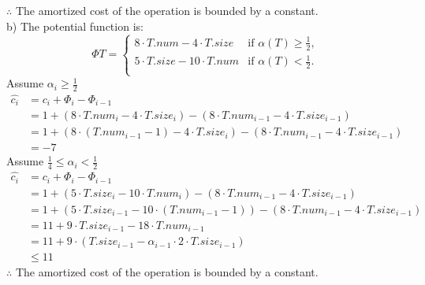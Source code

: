 \documentclass[12pt,letterpaper]{article}
\begin{document}
$\therefore$ The amortized cost of the operation is bounded by a constant. \\
b) The potential function is:
\begin{equation}
    \Phi{T}=
   \begin{cases}
   8 \cdot T.num - 4 \cdot T.size &\mbox{if $\alpha(T) \ge \frac{1}{2}$,}\\
   5 \cdot T.size - 10 \cdot T.num &\mbox{if $\alpha(T) < \frac{1}{2}$.}\\
   \end{cases}
\end{equation}
Assume $\alpha_{i} \ge \frac{1}{2}$
\begin{align*}
\widehat{c_i} &= c_i + \Phi_{i} - \Phi_{i-1} \\
&= 1 + ( 8 \cdot T.num_{i} - 4 \cdot T.size_{i} ) - ( 8 \cdot T.num_{i-1} - 4 \cdot T.size_{i-1} ) \\
&= 1 + ( 8 \cdot (T.num_{i-1} - 1) - 4 \cdot T.size_{i} ) - ( 8 \cdot T.num_{i-1} - 4 \cdot T.size_{i-1} ) \\
&= -7
\end{align*}
Assume $\frac{1}{4} \le \alpha_{i} < \frac{1}{2}$
\begin{align*}
\widehat{c_i} &= c_i + \Phi_{i} - \Phi_{i-1} \\
&= 1 + ( 5 \cdot T.size_{i}  - 10 \cdot T.num_{i} ) - ( 8 \cdot T.num_{i-1} - 4 \cdot T.size_{i-1} ) \\
&= 1 + ( 5 \cdot T.size_{i-1} - 10 \cdot (T.num_{i-1} - 1)) - ( 8 \cdot T.num_{i-1} - 4 \cdot T.size_{i-1} ) \\
&= 11 + 9 \cdot T.size_{i-1} - 18 \cdot T.num_{i-1} \\
&= 11 + 9 \cdot (T.size_{i-1} - \alpha_{i-1} \cdot 2 \cdot T.size_{i-1}) \\
&\le 11
\end{align*}
$\therefore$ The amortized cost of the operation is bounded by a constant.
\end{document}

